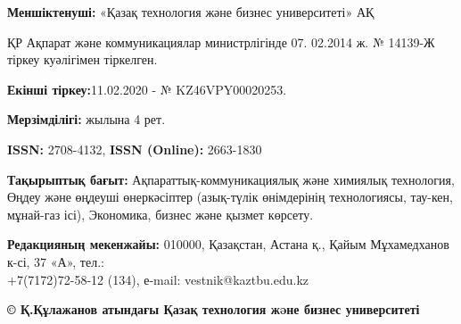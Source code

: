 {\textbf{Меншіктенуші:} «Қазақ технология және бизнес университеті» АҚ

ҚР Ақпарат және коммуникациялар министрлігінде 07. 02.2014 ж. № 14139-Ж тіркеу куәлігімен тіркелген.

\textbf{Екінші тіркеу:}11.02.2020 - № KZ46VPY00020253.

\textbf{Мерзімділігі:} жылына 4 рет.

\textbf{ISSN:} 2708-4132, \textbf{ISSN (Online):} 2663-1830

\textbf{Тақырыптық бағыт:} Ақпараттық-коммуникациялық және химиялық
технология, Өңдеу және өңдеуші өнеркәсіптер (азық-түлік өнімдерінің
технологиясы, тау-кен, мұнай-газ ісі), Экономика, бизнес және қызмет көрсету.

\textbf{Редакцияның мекенжайы:} 010000, Қазақстан, Астана қ., Қайым
Мұхамедханов к-сі, 37 «А», тел.: \\+7(7172)72-58-12 (134), е-mail:
vestnik@kaztbu.edu.kz
\vfill
\begin{center}
\textbf{\normalsize © Қ.Құлажанов атындағы Қазақ технология жəне бизнес университеті}
\end{center}
}

